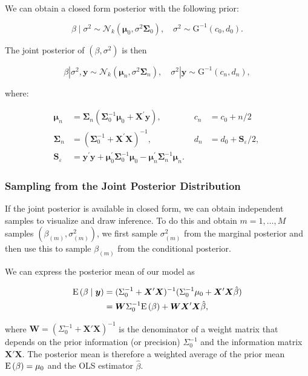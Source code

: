 We can obtain a closed form posterior with the following prior:

\[
\beta \mid \sigma^2 \sim \mathcal{N}_k\left(\bm{\mu}_0, \sigma^2 \bm{\Sigma}_0\right), \quad \sigma^2 \sim \mathrm{G}^{-1}\left(c_0, d_0\right) .
\]

The joint posterior of $\left(\beta, \sigma^2\right)$ is then

\[
\beta\left|\sigma^2, \bm{y} \sim \mathcal{N}_k\left(\bm{\mu}_n, \sigma^2 \bm{\Sigma}_n\right), \quad \sigma^2\right| \bm{y} \sim \mathrm{G}^{-1}\left(c_n, d_n\right),
\]

where:

\begin{align*}
\bm{\mu}_n&=\bm{\Sigma}_n\left(\bm{\Sigma}_0^{-1} \bm{\mu}_0+\bm{X}^{\prime} \bm{y}\right),  &c_n&=c_0+n / 2 \\
\bm{\Sigma}_n&=\left(\bm{\Sigma}_0^{-1}+\bm{X}^{\prime} \bm{X}\right)^{-1},  &d_n&=d_0+\bm{S}_{\varepsilon} / 2 \text {, } \\
\bm{S}_{\varepsilon}&=\bm{y}^{\prime} \bm{y}+\bm{\mu}_0^{\prime} \bm{\Sigma}_0^{-1} \bm{\mu}_0-\bm{\mu}_n^{\prime} \bm{\Sigma}_n^{-1} \bm{\mu}_n \text {. } 
\end{align*}

\subsubsection{Sampling from the Joint Posterior Distribution}

If the joint posterior is available in closed form, we can obtain independent samples to visualize and draw inference. To do this and obtain $m=1,\dots,M$ samples $(\beta_{(m)},\sigma^2_{(m)})$, we first sample $\sigma^2_{(m)}$ from the marginal posterior and then use this to sample $\beta_{(m)}$ from the conditional posterior. 

We can express the posterior mean of our model as 

\begin{align*}
	\mathrm{E}\left({\beta\mid\bm{y}}\right) &= (\Sigma_0^{-1}+\bm{X}'\bm{X})^{-1}(\Sigma_0^{-1}\mu_0+\bm{X}'\bm{X}\hat\beta) \\
	&= \bm{W}\Sigma_0^{-1}\mathrm{E}\left({\beta}\right) + \bm{WX}'\bm{X}\hat\beta,
\end{align*}

where $\bm{W} = (\Sigma_0^{-1}+\bm{X}'\bm{X})^{-1}$ is the denominator of a weight matrix that depends on the prior information (or precision) $\Sigma_0^{-1}$ and the information matrix $\bm{X}'\bm{X}$. The posterior mean is therefore a weighted average of the prior mean $\mathrm{E}\left({\beta}\right) = \mu_0$ and the OLS estimator $\hat\beta$.

